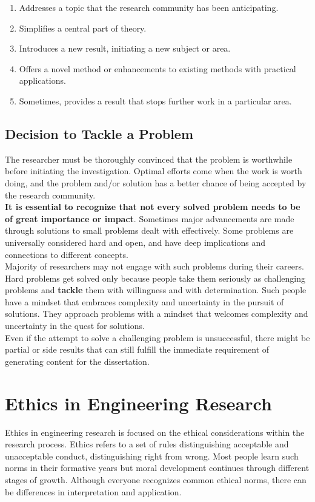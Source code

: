 \documentclass{article}
\begin{document}
	\begin{enumerate}[label=\roman*)]
		\item Addresses a topic that the research community has been anticipating.
		\item Simplifies a central part of theory.
		\item Introduces a new result, initiating a new subject or area.
		\item Offers a novel method or enhancements to existing methods with practical applications.
		\item Sometimes, provides a result that stops further work in a particular area.
	\end{enumerate}

	\subsection{Decision to Tackle a Problem}
	The researcher must be thoroughly convinced that the problem is worthwhile before initiating the
	investigation.
	Optimal efforts come when the work is worth doing, and the problem and/or solution has a better chance of
	being accepted by the research community. \\

	\noindent \textbf{It is essential to recognize that not every solved problem needs to be of great
	importance or impact}.
	Sometimes major advancements are made through solutions to small problems dealt with effectively.
	Some problems are universally considered hard and open, and have deep implications and connections to
	different concepts. \\

	\noindent Majority of researchers may not engage with such problems during their careers.
	Hard problems get solved only because people take them seriously as challenging problems and
	\textbf{tackle} them with willingness and with determination.
	Such people have a mindset that embraces complexity and uncertainty in the pursuit of solutions.
	They approach problems with a mindset that welcomes complexity and uncertainty in the quest for solutions.
	\\

	\noindent Even if the attempt to solve a challenging problem is unsuccessful, there might be partial or
	side results that can still fulfill the immediate requirement of generating content for the dissertation.

	\section{Ethics in Engineering Research}
	Ethics in engineering research is focused on the ethical considerations within the research process.
	Ethics refers to a set of rules distinguishing acceptable and unacceptable conduct, distinguishing right
	from wrong.
	Most people learn such norms in their formative years but moral development continues through different
	stages of growth.
	Although everyone recognizes common ethical norms, there can be differences in interpretation and
	application.
\end{document}
